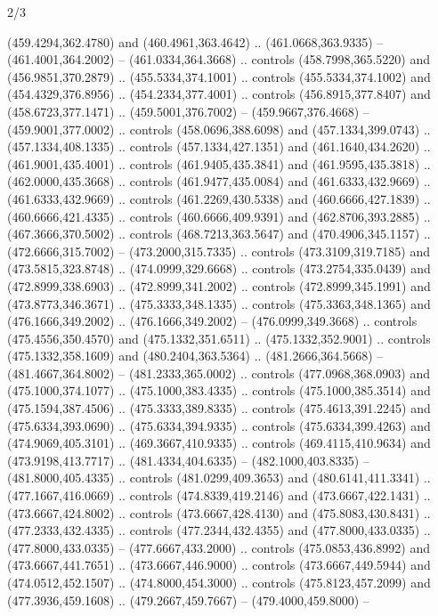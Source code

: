 \begin{flagdescription}{2/3}
\begin{scope}[xshift=0.5\flaglength,yshift=0.5\flagwidth,scale=\flagwidth/525.28]
\begin{scope}[y=0.1mm, x=0.1mm, yscale=-1,shift={(-381.5,-404)}]
\begin{scope}[shift={(5.25001,4.53053)},miter limit=4.00,line width=0.800\lw]
  (459.4294,362.4780) and (460.4961,363.4642) .. (461.0668,363.9335) --
  (461.4001,364.2002) -- (461.0334,364.3668) .. controls (458.7998,365.5220) and
  (456.9851,370.2879) .. (455.5334,374.1001) .. controls (455.5334,374.1002) and
  (454.4329,376.8956) .. (454.2334,377.4001) .. controls (456.8915,377.8407) and
  (458.6723,377.1471) .. (459.5001,376.7002) -- (459.9667,376.4668) --
  (459.9001,377.0002) .. controls (458.0696,388.6098) and (457.1334,399.0743) ..
  (457.1334,408.1335) .. controls (457.1334,427.1351) and (461.1640,434.2620) ..
  (461.9001,435.4001) .. controls (461.9405,435.3841) and (461.9595,435.3818) ..
  (462.0000,435.3668) .. controls (461.9477,435.0084) and (461.6333,432.9669) ..
  (461.6333,432.9669) .. controls (461.2269,430.5338) and (460.6666,427.1839) ..
  (460.6666,421.4335) .. controls (460.6666,409.9391) and (462.8706,393.2885) ..
  (467.3666,370.5002) .. controls (468.7213,363.5647) and (470.4906,345.1157) ..
  (472.6666,315.7002) -- (473.2000,315.7335) .. controls (473.3109,319.7185) and
  (473.5815,323.8748) .. (474.0999,329.6668) .. controls (473.2754,335.0439) and
  (472.8999,338.6903) .. (472.8999,341.2002) .. controls (472.8999,345.1991) and
  (473.8773,346.3671) .. (475.3333,348.1335) .. controls (475.3363,348.1365) and
  (476.1666,349.2002) .. (476.1666,349.2002) -- (476.0999,349.3668) .. controls
  (475.4556,350.4570) and (475.1332,351.6511) .. (475.1332,352.9001) .. controls
  (475.1332,358.1609) and (480.2404,363.5364) .. (481.2666,364.5668) --
  (481.4667,364.8002) -- (481.2333,365.0002) .. controls (477.0968,368.0903) and
  (475.1000,374.1077) .. (475.1000,383.4335) .. controls (475.1000,385.3514) and
  (475.1594,387.4506) .. (475.3333,389.8335) .. controls (475.4613,391.2245) and
  (475.6334,393.0690) .. (475.6334,394.9335) .. controls (475.6334,399.4263) and
  (474.9069,405.3101) .. (469.3667,410.9335) .. controls (469.4115,410.9634) and
  (473.9198,413.7717) .. (481.4334,404.6335) -- (482.1000,403.8335) --
  (481.8000,405.4335) .. controls (481.0299,409.3653) and (480.6141,411.3341) ..
  (477.1667,416.0669) .. controls (474.8339,419.2146) and (473.6667,422.1431) ..
  (473.6667,424.8002) .. controls (473.6667,428.4130) and (475.8083,430.8431) ..
  (477.2333,432.4335) .. controls (477.2344,432.4355) and (477.8000,433.0335) ..
  (477.8000,433.0335) -- (477.6667,433.2000) .. controls (475.0853,436.8992) and
  (473.6667,441.7651) .. (473.6667,446.9000) .. controls (473.6667,449.5944) and
  (474.0512,452.1507) .. (474.8000,454.3000) .. controls (475.8123,457.2099) and
  (477.3936,459.1608) .. (479.2667,459.7667) -- (479.4000,459.8000) --

\end{scope}
\end{scope}
\end{scope}
\end{flagdescription}

